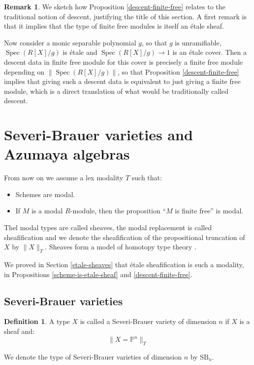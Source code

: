 \documentclass[10pt,a4paper]{article}
\theoremstyle{definition}
\newtheorem{definition}[theorem]{Definition}
\newtheorem{remark}[theorem]{Remark}
\DeclareMathOperator{\Spec}{Spec}
\newcommand{\SB}{\mathrm{SB}}
\newcommand{\propTrunc}[1]{\lVert #1 \rVert}
\newcommand{\bP}{\mathbb{P}}
\begin{document}
\begin{remark}
We sketch how Proposition \ref{descent-finite-free} relates to the traditional notion of descent, justifying the title of this section. 
A first remark is that it implies that the type of finite free modules is itself an étale sheaf.

Now consider a monic separable polynomial $g$, so that $g$ is unramifiable, $\Spec(R[X]/g)$ is étale and $\Spec(R[X]/g)\to 1$ is an étale cover. Then a descent data in finite free module for this cover is precisely a finite free module depending on 
$\propTrunc{\Spec(R[X]/g)}$, so that Proposition \ref{descent-finite-free} implies that giving such a descent data is equivalent to just giving a finite free module, which is a direct translation of what would be traditionally called descent.
\end{remark}



\section{Severi-Brauer varieties and Azumaya algebras}

From now on we assume a lex modality $T$ such that:
\begin{itemize}
\item Schemes are modal.
\item If $M$ is a modal $R$-module, then the proposition ``$M$ is finite free'' is modal.
\end{itemize}
Thel modal types are called sheaves, the modal replacement is called sheafification and we denote the sheafification of the propositional truncation of $X$ by $\propTrunc{X}_T$. Sheaves form a model of homotopy type theory \cite{modalities,Quirin16}.

We proved in Section \ref{etale-sheaves} that étale sheafification is such a modality, in Propositions \ref{scheme-is-etale-sheaf} and \ref{descent-finite-free}.


\subsection{Severi-Brauer varieties}

\begin{definition}
A type $X$ is called a Severi-Brauer variety of dimension $n$ if $X$ is a sheaf and:
\[\propTrunc{X=\bP^n}_T\]
\end{definition}

We denote the type of Severi-Brauer varieties of dimension $n$ by $\SB_n$.
\end{document}
